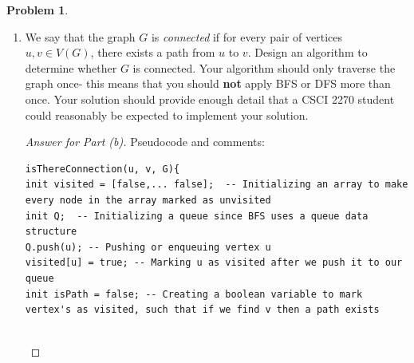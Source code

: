 \documentclass[11pt]{article}
\theoremstyle{definition}
\theoremstyle{definition}
\newtheorem{required}{Problem}
\theoremstyle{definition}
\begin{document}
\begin{required}
\begin{enumerate}[label=(\alph*)]
\begin{proof}[Answer for Part (a)]
\begin{center}
\begin{lstlisting}
while(Q.is not empty){, -- Creating a while loop to traverse through the graph G 
   x = Q.pop; -- Popping off the vertex so we mark it as visited 
   if(x == vertex v){, -- Checking vertex X to see if it is vertex V 
      isPath = true; -- If it is vertex v than mark it as true, such that a path exists between u and v 
   }
   for (each neighbor vertex){, -- For loop to traverse through the adjacent vertexes of x 
      if (neighbor vertex has not been visited){, -- If the neighbor vertex has not been visited
          Q.push(adjacent vertex); -- Pushing onto the queue the neighbor vertex to be visited
          visited[x] = true; -- Marking the vertex visited as true
      }
   } 
}
return isPath; -- Returning the boolean variable such that a path between u and v exists 
\end{lstlisting}
\end{center}
\end{proof}



\newpage
\item We say that the graph $G$ is \textit{connected} if for every pair of vertices $u, v \in V(G)$, there exists a path from $u$ to $v$. Design an algorithm to determine whether $G$ is connected. Your algorithm should only traverse the graph once- this means that you should \textbf{not} apply BFS or DFS more than once. Your solution should provide enough detail that a CSCI 2270 student could reasonably be expected to implement your solution.

\begin{proof}[Answer for Part (b)] 
Pseudocode and comments:\\
\begin{center}
\begin{lstlisting}
isThereConnection(u, v, G){ 
init visited = [false,... false];  -- Initializing an array to make every node in the array marked as unvisited 
init Q;  -- Initializing a queue since BFS uses a queue data structure 
Q.push(u); -- Pushing or enqueuing vertex u 
visited[u] = true; -- Marking u as visited after we push it to our queue
init isPath = false; -- Creating a boolean variable to mark vertex's as visited, such that if we find v then a path exists 


\end{lstlisting}
\end{center}
\end{proof}
\end{enumerate}
\end{required}
\end{document}
